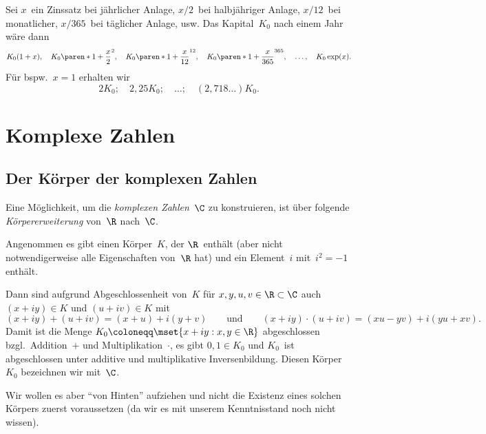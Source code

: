 \documentclass[a4paper]{article}
\begin{document}

\begin{example}
    Sei $x$~ein Zinssatz bei jährlicher Anlage, $x/2$~bei halbjähriger Anlage, $x/12$~bei monatlicher, $x/365$~bei täglicher Anlage, usw. Das Kapital~$K_0$ nach einem Jahr wäre dann
    \begin{equation*}
        K_0(1+x), \quad K_0\paren*{1+\frac{x}{2}}^2, \quad K_0\paren*{1+\frac{x}{12}}^{12}, \quad K_0\paren*{1+\frac{x}{365}}^{365}, \quad \ldots, \quad K_0 \exp(x).
    \end{equation*}
    Für bspw.~$x = 1$ erhalten wir
    \begin{equation*}
        2K_0; \quad 2,25K_0; \quad \ldots; \quad (2,718\ldots)K_0.
    \end{equation*}
\end{example}

\section{Komplexe Zahlen}

\subsection{Der Körper der komplexen Zahlen}

Eine Möglichkeit, um die \emph{komplexen Zahlen}~$\C$ zu konstruieren, ist über folgende \emph{Körpererweiterung} von~$\R$ nach~$\C$.

Angenommen es gibt einen Körper~$K$, der $\R$~enthält (aber nicht notwendigerweise alle Eigenschaften von~$\R$ hat) und ein Element~$i$ mit~$i^2 = -1$ enthält.

Dann sind aufgrund Abgeschlossenheit von~$K$ für $x,y,u,v \in \R \subset \C$ auch $(x+iy) \in K$ und $(u+iv) \in K$ mit
\begin{equation*}
    (x+iy) + (u+iv) = (x+u) + i(y+v) \qquad\text{und}\qquad (x+iy) \cdot (u+iv) = (xu-yv) + i(yu+xv).
\end{equation*}
Damit ist die Menge $K_0 \coloneqq \mset{x+iy : x,y \in \R}$ abgeschlossen bzgl.\ Addition~$+$ und Multiplikation~$\cdot$, es gibt $0, 1 \in K_0$ und $K_0$~ist abgeschlossen unter additive und multiplikative Inversenbildung. Diesen Körper~$K_0$ bezeichnen wir mit~$\C$.

Wir wollen es aber "`von Hinten"' aufziehen und nicht die Existenz eines solchen Körpers zuerst voraussetzen (da wir es mit unserem Kenntnisstand noch nicht wissen).
\end{document}
